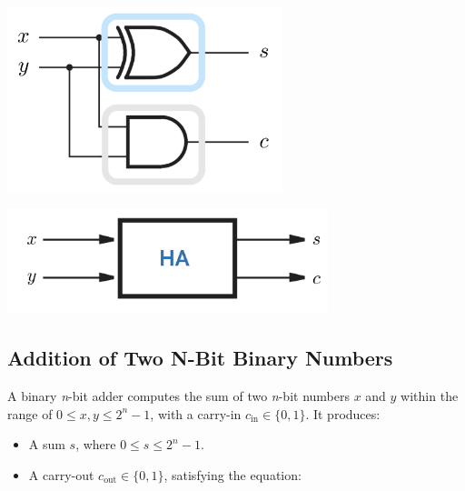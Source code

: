 \documentclass[12pt,openany]{book}
\begin{document}
			   
		\vspace*{10px}
			      		\begin{minipage}[htp]{0.45\textwidth} %
			      			\centering
			      			\includegraphics[width=0.60\textwidth]{circuits/7.1.3.png} %
			      		\end{minipage}				
						\hfill
						\vline
						\hfill
			      		\begin{minipage}[htp]{0.45\textwidth} %
			      			\centering
			      			\includegraphics[width=0.70\textwidth]{circuits/7.1.3_2.png} %
			      		\end{minipage}
			      		
			    
	
			      	
			      	\subsection{Addition of Two N-Bit Binary Numbers}
			      	A binary \textit{n}-bit adder computes the sum of two \textit{n}-bit numbers $x$ and $y$ within the range of $0 \leq x, y \leq 2^n - 1$, with a carry-in $c_{\text{in}} \in \{0, 1\}$. It produces:
			      	
			      	\begin{itemize}
			      		\item[] A sum $s$, where $0 \leq s \leq 2^n - 1$.
			      		\item[] A carry-out $c_{\text{out}} \in \{0, 1\}$, satisfying the equation:
			      	\end{itemize}
			      	
\end{document}
